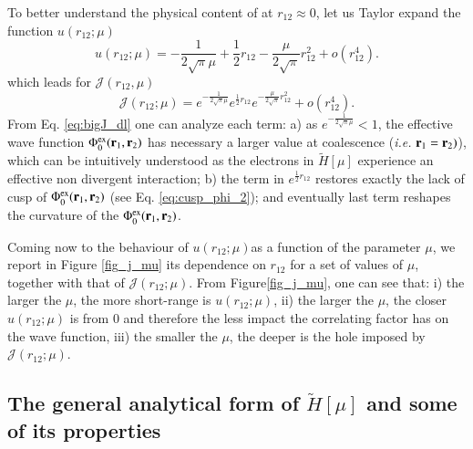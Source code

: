\documentclass[aip,jcp,reprint,noshowkeys,superscriptaddress]{revtex4-1}
\newcommand{\br}[0]{{\bf {r}}}
\newcommand{\phiex}[0]{\Phi^{\text{ex}}_0}
\begin{document}
To better understand the physical content of at $r_{12}\approx 0$,  
let us Taylor expand the function $u(r_{12};\mu)$ 
\begin{equation}
 \label{eq:j_dl}
 u(r_{12};\mu) = -\frac{1}{2\sqrt{\pi}\mu} + \frac{1}{2}r_{12} - \frac{\mu}{2\sqrt{\pi}} r_{12}^2 + o(r_{12}^4).
\end{equation}
which leads for $\mathcal{J}(r_{12},\mu)$
\begin{equation}
 \label{eq:bigJ_dl}
 \mathcal{J}(r_{12};\mu) = e^{-\frac{1}{2\sqrt{\pi}\mu}} e^{ \frac{1}{2}r_{12}} e^{- \frac{\mu}{2\sqrt{\pi}} r_{12}^2} + o(r_{12}^4) .
\end{equation}
From Eq. \eqref{eq:bigJ_dl} one can analyze each term: a) as $e^{-\frac{1}{2\sqrt{\pi}\mu}}<1$, the effective wave function  $\phiex(\br{}_1,\br{}_2)$ has necessary a larger value at coalescence (\textit{i.e.} $\br{}_1=\br{}_2)$), which can be intuitively understood as the electrons in $\tilde{H}[\mu]$ experience an effective non divergent interaction; 
b) the term in $e^{ \frac{1}{2}r_{12}} $ restores exactly the lack of cusp of $\phiex(\br{}_1,\br{}_2)$ (see Eq. \eqref{eq:cusp_phi_2}); and eventually last term reshapes the curvature of the $\phiex(\br{}_1,\br{}_2)$. 

Coming now to the behaviour of $u(r_{12};\mu)$as a function of the parameter $\mu$, we report in Figure \ref{fig_j_mu} its dependence on $r_{12}$ for a set of values of $\mu$, together with that of $\mathcal{J}(r_{12};\mu)$. 
From Figure\ref{fig_j_mu}, one can see that: i) the larger the $\mu$, the more short-range is $u(r_{12};\mu)$, ii) the larger the $\mu$, the closer $u(r_{12};\mu)$ is from 0 and therefore the less impact the correlating factor has on the wave function, iii) the smaller the $\mu$, the deeper is the hole imposed by $\mathcal{J}(r_{12};\mu)$. 


\subsection{The general analytical form of  $\tilde{H}[\mu]$ and some of its properties}
\label{sec:ht_general}
\end{document}
